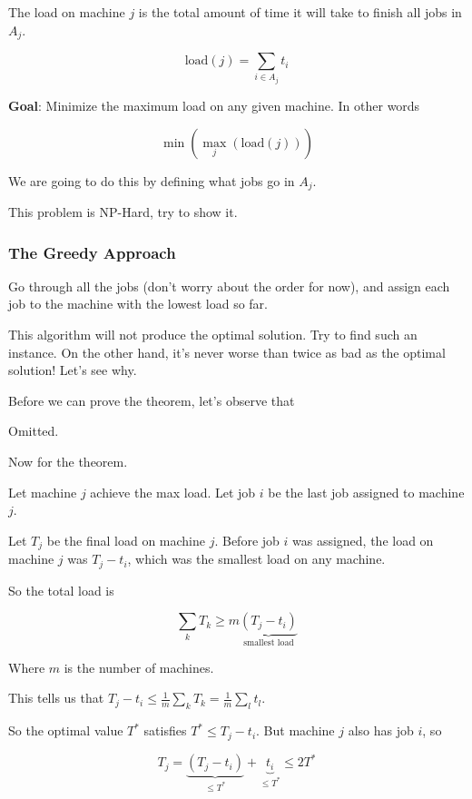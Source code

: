 \documentclass[12pt]{article}
\begin{document}
  The load on machine $j$ is the total amount of time it will take to finish all
  jobs in $A_j$.

  \[
    \text{load}(j) = \sum_{i \in A_j} t_i
  \]

  {\bf Goal}: Minimize the maximum load on any given machine. In other words

  \[
    \min(\max_j (\text{load}(j)))
  \]

  We are going to do this by defining what jobs go in $A_j$. 

  This problem is NP-Hard, try to show it.

  \subsubsection{The Greedy Approach}

  Go through all the jobs (don't worry about the order for now), and assign each
  job to the machine with the lowest load so far.

  This algorithm will not produce the optimal solution. Try to find such an
  instance. On the other hand, it's never worse than twice as bad as the optimal
  solution! Let's see why.

  Before we can prove the theorem, let's observe that

  {
    Omitted.
  }

  Now for the theorem.

  {
    Let machine $j$ achieve the max load. Let job $i$ be the last job assigned
    to machine $j$.

    Let $T_j$ be the final load on machine $j$. Before job $i$ was assigned, the
    load on machine $j$ was $T_j - t_i$, which was the smallest load on any
    machine.

    So the total load is

    \[
      \sum_k T_k \ge m \underbrace{(T_j - t_i)}_\text{smallest load}
    \]

    Where $m$ is the number of machines.

    This tells us that $T_j - t_i \le \frac{1}{m} \sum_k T_k = \frac{1}{m}
    \sum_l t_l$.

    So the optimal value $T^*$ satisfies $T^* \le T_j - t_i$. But machine $j$
    also has job $i$, so

    \[
      T_j = \underbrace{(T_j - t_i)}_{\le T^*} + \underbrace{t_i}_{\le T^*} \le 2 T^*
    \]
  }
\end{document}
